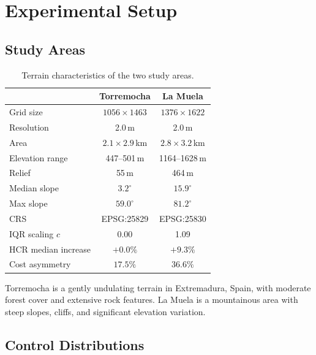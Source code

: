 \documentclass[11pt,a4paper]{article}
\begin{document}
\section{Experimental Setup}
\label{sec:experiments}

\subsection{Study Areas}

\begin{table}[H]
\centering
\caption{Terrain characteristics of the two study areas.}
\label{tab:terrain}
\begin{tabular}{lcc}
\toprule
& \textbf{Torremocha} & \textbf{La Muela} \\
\midrule
Grid size & $1056 \times 1463$ & $1376 \times 1622$ \\
Resolution & 2.0\,m & 2.0\,m \\
Area & $2.1 \times 2.9$\,km & $2.8 \times 3.2$\,km \\
Elevation range & 447--501\,m & 1164--1628\,m \\
Relief & 55\,m & 464\,m \\
Median slope & $3.2^\circ$ & $15.9^\circ$ \\
Max slope & $59.0^\circ$ & $81.2^\circ$ \\
CRS & EPSG:25829 & EPSG:25830 \\
IQR scaling $c$ & 0.00 & 1.09 \\
HCR median increase & $+0.0\%$ & $+9.3\%$ \\
Cost asymmetry & $17.5\%$ & $36.6\%$ \\
\bottomrule
\end{tabular}
\end{table}

Torremocha is a gently undulating terrain in Extremadura, Spain, with moderate forest cover and extensive rock features.
La Muela is a mountainous area with steep slopes, cliffs, and significant elevation variation.

\subsection{Control Distributions}
\end{document}
